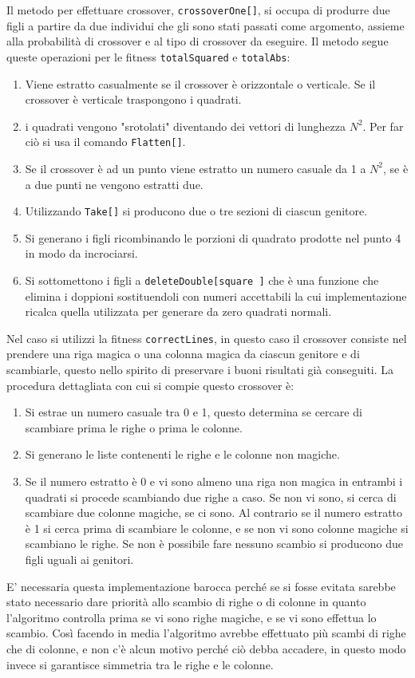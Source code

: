 \documentclass[italian,twoside,twocolumn]{article}
\begin{document}
Il metodo per effettuare crossover, \texttt{crossoverOne[]}, si occupa di produrre due figli a partire da due individui che gli sono stati passati come argomento, assieme alla probabilità di crossover e al tipo di crossover da eseguire. Il metodo segue queste operazioni per le fitness \texttt{totalSquared} e \texttt{totalAbs}:
\begin{enumerate}
	\item Viene estratto casualmente se il crossover è orizzontale o verticale. Se il crossover è verticale traspongono i quadrati.
	\item i quadrati vengono "srotolati" diventando dei vettori di lunghezza $ N^2 $. Per far ciò si usa il comando \texttt{Flatten[]}.
	\item Se il crossover è ad un punto viene estratto un numero casuale da 1 a $ N^2 $, se è a due punti ne vengono estratti due.
	\item Utilizzando \texttt{Take[]} si producono due o tre sezioni di ciascun genitore.
	\item Si generano i figli ricombinando le porzioni di quadrato prodotte nel punto 4 in modo da incrociarsi.
	\item Si sottomettono i figli a \texttt{deleteDouble[square ]} che è una funzione che elimina i doppioni sostituendoli con numeri accettabili la cui implementazione ricalca quella utilizzata per generare da zero quadrati normali. 
\end{enumerate}
Nel caso si utilizzi la fitness \texttt{correctLines}, in questo caso il crossover consiste nel prendere una riga magica o una colonna magica da ciascun genitore e di scambiarle, questo nello spirito di preservare i buoni risultati già conseguiti. La procedura dettagliata con cui si compie questo crossover è:
\begin{enumerate}
	\item Si estrae un numero casuale tra 0 e 1, questo determina se cercare di scambiare prima le righe o prima le colonne.
	\item Si generano le liste contenenti le righe e le colonne non magiche.
	\item Se il numero estratto è 0 e vi sono almeno una riga non magica in entrambi i quadrati si procede scambiando due righe a caso. Se non vi sono, si cerca di scambiare due colonne magiche, se ci sono. Al contrario se il numero estratto è 1 si cerca prima di scambiare le colonne, e se non vi sono colonne magiche si scambiano le righe. Se non è possibile fare nessuno scambio si producono due figli uguali ai genitori.
\end{enumerate}
E' necessaria questa implementazione barocca perché se si fosse evitata sarebbe stato necessario dare priorità allo scambio di righe o di colonne in quanto l'algoritmo controlla prima se vi sono righe magiche, e se vi sono effettua lo scambio. Così facendo in media l'algoritmo avrebbe effettuato più scambi di righe che di colonne, e non c'è alcun motivo perché ciò debba accadere, in questo modo invece si garantisce simmetria tra le righe e le colonne. 
\end{document}
